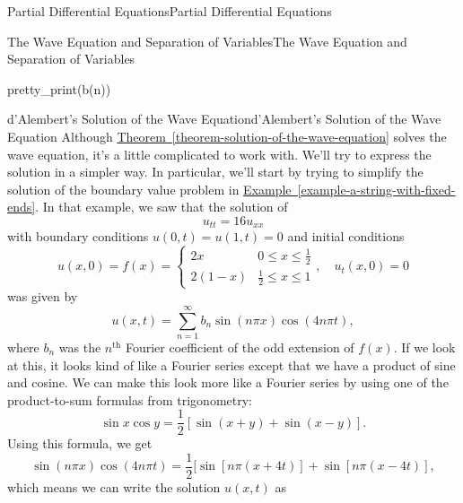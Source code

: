 \documentclass[10pt,]{book}
\numberwithin{equation}{section}
\renewcommand{\th}{\text{th}}
\newcommand{\amp}{&}
\begin{document}
\begin{chapterptx}{Partial Differential Equations}{}{Partial Differential Equations}{}{}
\begin{sectionptx}{The Wave Equation and Separation of Variables}{}{The Wave Equation and Separation of Variables}{}{}
\begin{sageinput}
pretty_print(b(n))
\end{sageinput}
\end{sectionptx}
%
%
\typeout{************************************************}
\typeout{************************************************}
%
\begin{sectionptx}{d'Alembert's Solution of the Wave Equation}{}{d'Alembert's Solution of the Wave Equation}{}{}\label{section-d-alembert-s-solution-of-the-wave-equation}
\hypertarget{p-481}{}%
Although \hyperref[theorem-solution-of-the-wave-equation]{Theorem~\ref{theorem-solution-of-the-wave-equation}} solves the wave equation, it's a little complicated to work with. We'll try to express the solution in a simpler way. In particular, we'll start by trying to simplify the solution of the boundary value problem in \hyperref[example-a-string-with-fixed-ends]{Example~\ref{example-a-string-with-fixed-ends}}. In that example, we saw that the solution of%
%
\begin{equation*}
u_{tt} = 16u_{xx}
\end{equation*}
\hypertarget{p-482}{}%
with boundary conditions \(u(0,t) = u(1,t) = 0\) and initial conditions%
%
\begin{equation*}
u(x,0) = f(x) = \begin{cases} 2x \amp 0\leq x\leq \frac{1}{2} \\ 2(1-x) \amp \frac{1}{2}\leq x\leq 1 \end{cases},\quad u_{t}(x,0) = 0
\end{equation*}
\hypertarget{p-483}{}%
was given by%
%
\begin{equation*}
u(x,t) = \sum_{n=1}^{\infty}b_{n}\sin(n\pi x)\cos(4n\pi t),
\end{equation*}
\hypertarget{p-484}{}%
where \(b_{n}\) was the \(n^{\th}\) Fourier coefficient of the odd extension of \(f(x)\). If we look at this, it looks kind of like a Fourier series except that we have a product of sine and cosine. We can make this look more like a Fourier series by using one of the product-to-sum formulas from trigonometry:%
%
\begin{equation*}
\sin x\cos y = \frac{1}{2}[\sin(x+y)+\sin(x-y)].
\end{equation*}
\hypertarget{p-485}{}%
Using this formula, we get%
%
\begin{equation*}
\sin(n\pi x)\cos(4n\pi t) = \frac{1}{2}[\sin[n\pi(x+4t)]+\sin[n\pi(x-4t)],
\end{equation*}
\hypertarget{p-486}{}%
which means we can write the solution \(u(x,t)\) as%

\end{sectionptx}
\end{chapterptx}
\end{document}
